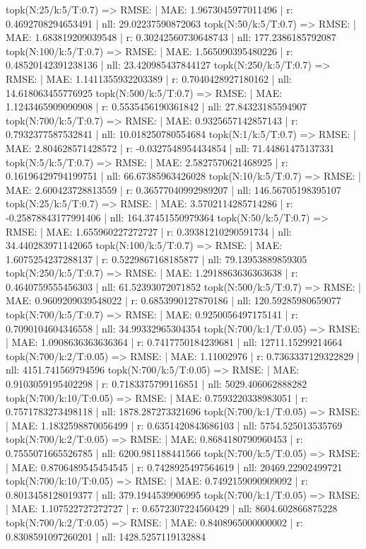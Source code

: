 topk(N:25/k:5/T:0.7) => RMSE: | MAE: 1.9673045977011496 | r: 0.4692708294653491 | nll: 29.02237590872063
topk(N:50/k:5/T:0.7) => RMSE: | MAE: 1.683819209039548 | r: 0.30242560730648743 | nll: 177.2386185792087
topk(N:100/k:5/T:0.7) => RMSE: | MAE: 1.565090395480226 | r: 0.48520142391238136 | nll: 23.420985437844127
topk(N:250/k:5/T:0.7) => RMSE: | MAE: 1.1411355932203389 | r: 0.7040428927180162 | nll: 14.618063455776925
topk(N:500/k:5/T:0.7) => RMSE: | MAE: 1.1243465909090908 | r: 0.5535456190361842 | nll: 27.84323185594907
topk(N:700/k:5/T:0.7) => RMSE: | MAE: 0.9325657142857143 | r: 0.7932377587532841 | nll: 10.018250780554684
topk(N:1/k:5/T:0.7) => RMSE: | MAE: 2.804628571428572 | r: -0.0327548954434854 | nll: 71.44861475137331
topk(N:5/k:5/T:0.7) => RMSE: | MAE: 2.5827570621468925 | r: 0.16196429794199751 | nll: 66.67385963426028
topk(N:10/k:5/T:0.7) => RMSE: | MAE: 2.600423728813559 | r: 0.36577040992989207 | nll: 146.56705198395107
topk(N:25/k:5/T:0.7) => RMSE: | MAE: 3.5702114285714286 | r: -0.25878843177991406 | nll: 164.37451550979364
topk(N:50/k:5/T:0.7) => RMSE: | MAE: 1.655960227272727 | r: 0.39381210290591734 | nll: 34.440283971142065
topk(N:100/k:5/T:0.7) => RMSE: | MAE: 1.6075254237288137 | r: 0.5229867168185877 | nll: 79.13953889859305
topk(N:250/k:5/T:0.7) => RMSE: | MAE: 1.2918863636363638 | r: 0.4640759555456303 | nll: 61.52393072071852
topk(N:500/k:5/T:0.7) => RMSE: | MAE: 0.9609209039548022 | r: 0.6853990127870186 | nll: 120.59285980659077
topk(N:700/k:5/T:0.7) => RMSE: | MAE: 0.9250056497175141 | r: 0.7090104604346558 | nll: 34.99332965304354
topk(N:700/k:1/T:0.05) => RMSE: | MAE: 1.0908636363636364 | r: 0.7417750184239681 | nll: 12711.15299214664
topk(N:700/k:2/T:0.05) => RMSE: | MAE: 1.11002976 | r: 0.7363337129322829 | nll: 4151.741569794596
topk(N:700/k:5/T:0.05) => RMSE: | MAE: 0.9103059195402298 | r: 0.7183375799116851 | nll: 5029.406062888282
topk(N:700/k:10/T:0.05) => RMSE: | MAE: 0.7593220338983051 | r: 0.7571783273498118 | nll: 1878.287273321696
topk(N:700/k:1/T:0.05) => RMSE: | MAE: 1.1832598870056499 | r: 0.6351420843686103 | nll: 5754.525013535769
topk(N:700/k:2/T:0.05) => RMSE: | MAE: 0.8684180790960453 | r: 0.7555071665526785 | nll: 6200.981188441566
topk(N:700/k:5/T:0.05) => RMSE: | MAE: 0.8706489545454545 | r: 0.7428925497564619 | nll: 20469.22902499721
topk(N:700/k:10/T:0.05) => RMSE: | MAE: 0.7492159090909092 | r: 0.8013458128019377 | nll: 379.1944539906995
topk(N:700/k:1/T:0.05) => RMSE: | MAE: 1.107522727272727 | r: 0.6572307224560429 | nll: 8604.602866875228
topk(N:700/k:2/T:0.05) => RMSE: | MAE: 0.8408965000000002 | r: 0.8308591097260201 | nll: 1428.5257119132884
